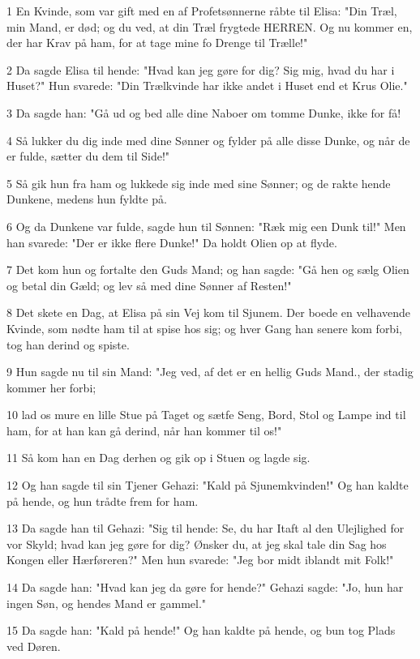 \par 1 En Kvinde, som var gift med en af Profetsønnerne råbte til Elisa: "Din Træl, min Mand, er død; og du ved, at din Træl frygtede HERREN. Og nu kommer en, der har Krav på ham, for at tage mine fo Drenge til Trælle!"
\par 2 Da sagde Elisa til hende: "Hvad kan jeg gøre for dig? Sig mig, hvad du har i Huset?" Hun svarede: "Din Trælkvinde har ikke andet i Huset end et Krus Olie."
\par 3 Da sagde han: "Gå ud og bed alle dine Naboer om tomme Dunke, ikke for få!
\par 4 Så lukker du dig inde med dine Sønner og fylder på alle disse Dunke, og når de er fulde, sætter du dem til Side!"
\par 5 Så gik hun fra ham og lukkede sig inde med sine Sønner; og de rakte hende Dunkene, medens hun fyldte på.
\par 6 Og da Dunkene var fulde, sagde hun til Sønnen: "Ræk mig een Dunk til!" Men han svarede: "Der er ikke flere Dunke!" Da holdt Olien op at flyde.
\par 7 Det kom hun og fortalte den Guds Mand; og han sagde: "Gå hen og sælg Olien og betal din Gæld; og lev så med dine Sønner af Resten!"
\par 8 Det skete en Dag, at Elisa på sin Vej kom til Sjunem. Der boede en velhavende Kvinde, som nødte ham til at spise hos sig; og hver Gang han senere kom forbi, tog han derind og spiste.
\par 9 Hun sagde nu til sin Mand: "Jeg ved, af det er en hellig Guds Mand., der stadig kommer her forbi;
\par 10 lad os mure en lille Stue på Taget og sætfe Seng, Bord, Stol og Lampe ind til ham, for at han kan gå derind, når han kommer til os!"
\par 11 Så kom han en Dag derhen og gik op i Stuen og lagde sig.
\par 12 Og han sagde til sin Tjener Gehazi: "Kald på Sjunemkvinden!" Og han kaldte på hende, og hun trådte frem for ham.
\par 13 Da sagde han til Gehazi: "Sig til hende: Se, du har Itaft al den Ulejlighed for vor Skyld; hvad kan jeg gøre for dig? Ønsker du, at jeg skal tale din Sag hos Kongen eller Hærføreren?" Men hun svarede: "Jeg bor midt iblandt mit Folk!"
\par 14 Da sagde han: "Hvad kan jeg da gøre for hende?" Gehazi sagde: "Jo, hun har ingen Søn, og hendes Mand er gammel."
\par 15 Da sagde han: "Kald på hende!" Og han kaldte på hende, og bun tog Plads ved Døren.
